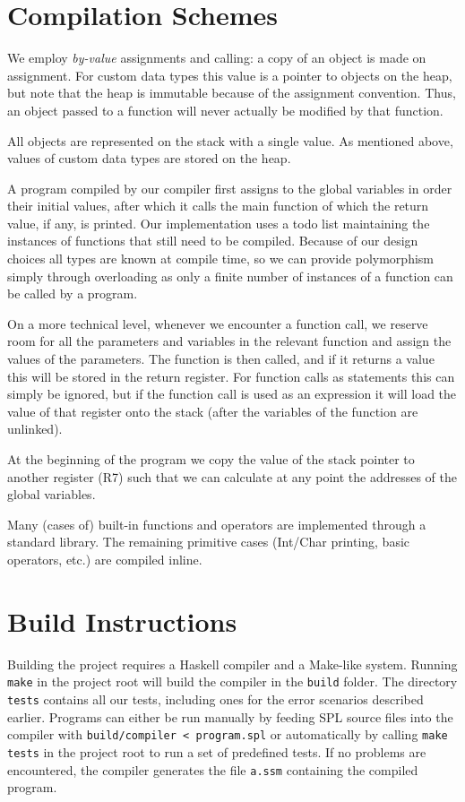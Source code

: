 \documentclass[a4paper]{article}
\begin{document}
\section{Compilation Schemes}

We employ \emph{by-value} assignments and calling: a copy of an object is made on assignment.
For custom data types this value is a pointer to objects on the heap, but note that the heap is immutable because of the assignment convention.
Thus, an object passed to a function will never actually be modified by that function.

All objects are represented on the stack with a single value.
As mentioned above, values of custom data types are stored on the heap.

A program compiled by our compiler first assigns to the global variables in order their initial values, after which it calls the main function of which the return value, if any, is printed.
Our implementation uses a todo list maintaining the instances of functions that still need to be compiled.
Because of our design choices all types are known at compile time, so we can provide polymorphism simply through overloading as only a finite number of instances of a function can be called by a program.

On a more technical level, whenever we encounter a function call, we reserve room for all the parameters and variables in the relevant function and assign the values of the parameters.
The function is then called, and if it returns a value this will be stored in the return register.
For function calls as statements this can simply be ignored, but if the function call is used as an expression it will load the value of that register onto the stack (after the variables of the function are unlinked).

At the beginning of the program we copy the value of the stack pointer to another register (R7) such that we can calculate at any point the addresses of the global variables.

Many (cases of) built-in functions and operators are implemented through a standard library.
The remaining primitive cases (Int/Char printing, basic operators, etc.) are compiled inline.

\section{Build Instructions}

Building the project requires a Haskell compiler and a Make-like system.
Running \verb|make| in the project root will build the compiler in the \verb|build| folder.
The directory \verb|tests| contains all our tests, including ones for the error scenarios described earlier.
Programs can either be run manually by feeding SPL source files into the compiler with \verb|build/compiler < program.spl| or automatically by calling \verb|make tests| in the project root to run a set of predefined tests.
If no problems are encountered, the compiler generates the file \verb|a.ssm| containing the compiled program.
\end{document}
